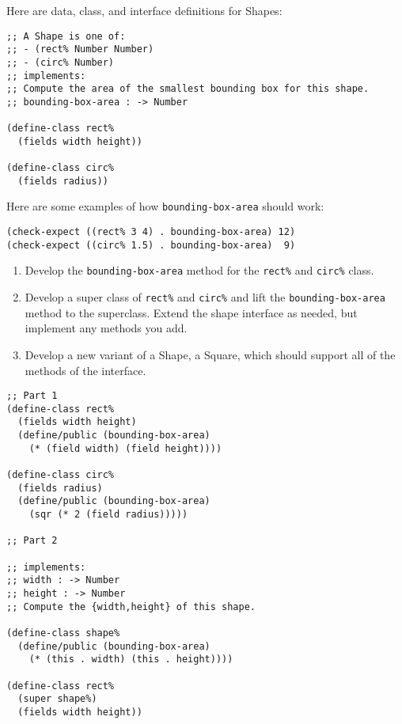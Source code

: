 \documentclass[12pt]{article}                   %
\def\pts#1{\marginpar{\footnotesize \raggedright  \fbox{#1 {\sc Points}}}}
\newenvironment{solution}{}{}
\newcommand\code[1]{\texttt{#1}}
\begin{document}
\begin{problem}\pts{??}

Here are data, class, and interface definitions for Shapes:
\begin{verbatim}
;; A Shape is one of:
;; - (rect% Number Number)
;; - (circ% Number)
;; implements:
;; Compute the area of the smallest bounding box for this shape.
;; bounding-box-area : -> Number

(define-class rect%
  (fields width height))

(define-class circ%
  (fields radius))
\end{verbatim}
%
Here are some examples of how \code{bounding-box-area} should work:
\begin{verbatim}
(check-expect ((rect% 3 4) . bounding-box-area) 12)
(check-expect ((circ% 1.5) . bounding-box-area)  9)
\end{verbatim}


\begin{enumerate}
\item Develop the \code{bounding-box-area} method for the
  \code{rect\%} and \code{circ\%} class.

\item Develop a super class of \code{rect\%} and \code{circ\%} and
  lift the \code{bounding-box-area} method to the superclass.  Extend
  the shape interface as needed, but implement any methods you add.

\item Develop a new variant of a Shape, a Square, which should support
  all of the methods of the interface.
\end{enumerate}

\begin{solution}
\begin{verbatim}
;; Part 1
(define-class rect% 
  (fields width height)
  (define/public (bounding-box-area)
    (* (field width) (field height))))
  
(define-class circ% 
  (fields radius)
  (define/public (bounding-box-area)
    (sqr (* 2 (field radius)))))

;; Part 2

;; implements:
;; width : -> Number
;; height : -> Number
;; Compute the {width,height} of this shape.

(define-class shape% 
  (define/public (bounding-box-area)
    (* (this . width) (this . height))))

(define-class rect% 
  (super shape%)
  (fields width height))
  

\end{verbatim}
\end{solution}
\end{problem}
\end{document}
